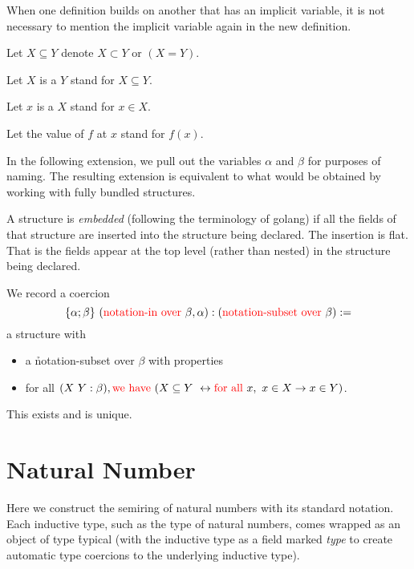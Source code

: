 \documentclass[12pt]{article}
\begin{document}
\begin{cnl}
\begin{remark}
When one definition builds on another that has an implicit variable,
it is not necessary to mention the implicit variable again in the new
definition.
\end{remark}


Let $X\subseteq Y$ denote $X\subset Y$ or $(X=Y)$.

Let $X$ is a  $Y$ stand for $X\subseteq Y$.

Let $x$ is a  $X$ stand for $x\in X$.

Let the value of $f$ at $x$ stand for $f(x)$.



\begin{remark}
In the following extension, we pull out the variables $\alpha$ and
$\beta$ for purposes of naming.  The resulting extension is equivalent
to what would be obtained by working with fully bundled structures.

A structure is {\it embedded} (following the terminology of golang) if
all the fields of that structure are inserted into the structure being
declared. The insertion is flat.  That is the fields appear at the top
level (rather than nested) in the structure being declared.
\end{remark}

We record a coercion 
\[
\{\alpha; \beta\}\ (\h{notation-in}\ \h{over}\ \beta,\alpha) : 
(\h{notation-subset}\ \h{over}\ \beta) \assign
\]
a structure with
\begin{itemize}
\item a \h{notation-subset} over $\beta$
with properties
\item for all  $(X\ Y : \beta), \h{we have}\ (X \subseteq Y\ \iff
\h{for all } x,\ x \in X \rightarrow x \in Y)$.
\end{itemize}
This exists and is unique.

\newpage
\section{Natural Number}

\begin{remark}
Here we construct the semiring of natural numbers with its standard
notation. Each inductive type, such as the type of natural numbers,
comes wrapped as an object of type \h{typical}
(with the inductive type as a field marked
\emph{type} to create automatic type coercions to the underlying
inductive type).
\end{remark}


\end{cnl}
\end{document}
